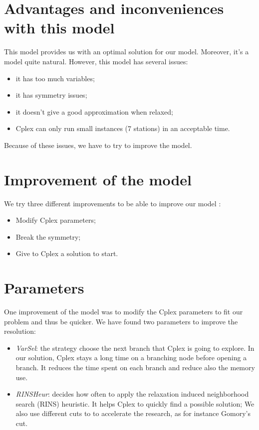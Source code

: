 \begin{bibunit}[ieeetr]
\section{Advantages and inconveniences with this model}
This model provides us with an optimal solution for our model.
Moreover, it's a model quite natural.
However, this model has several issues:
\begin{itemize}
\item it has too much variables;
\item it has symmetry issues;
\item it doesn't give a good approximation when relaxed;
\item Cplex can only run small instances (7 stations) in an acceptable time.
\end{itemize}
Because of these issues, we have to try to improve the model.

\section{Improvement of the model}
We try three different improvements to be able to improve our model :
\begin{itemize}
\item Modify Cplex parameters;
\item Break the symmetry;
\item Give to Cplex a solution to start.
\end{itemize}

\section{Parameters}
One improvement of the model was to modify the Cplex parameters to fit our problem and thus be quicker.
We have found two parameters to improve the resolution:
\begin{itemize}
\item \emph{VarSel}:
the strategy choose the next branch that Cplex is going to explore.
In our solution, Cplex stays a long time on a branching node before opening a branch.
It reduces the time spent on each branch and reduce also the memory use.
\item \emph{RINSHeur}:
decides how often to apply the relaxation induced neighborhood search (RINS) heuristic.
It helps Cplex to quickly find a possible solution;
We also use different cuts to to accelerate the research, as for instance Gomory's cut.
\end{itemize}


\end{bibunit}
